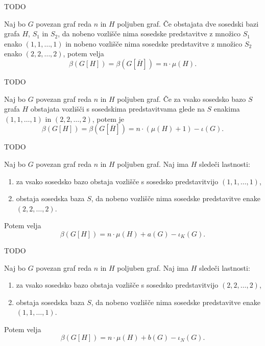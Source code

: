 \documentclass[mat1, tisk]{fmfdelo}
\newcommand{\1}{(1, 1, \ldots, 1)}
\newcommand{\2}{(2, 2, \ldots, 2)}
\begin{document}
\begin{dokaz}
    TODO
\end{dokaz}


\begin{trditev}
    Naj bo $G$ povezan graf reda $n$ in $H$ poljuben graf. Če obstajata dve sosedski bazi 
    grafa $H$, $S_1$ in $S_2$, da nobeno vozlišče nima sosedske predstavitve z množico $S_1$ 
    enako $\1$ in nobeno vozlišče nima sosedske predstavitve z množico $S_2$ 
    enako $\2$, potem velja $$\beta(G[H]) = \beta(G[\overline{H}]) = n \cdot \mu(H). $$
\end{trditev}

\begin{dokaz}
    TODO
\end{dokaz}


\begin{trditev}
    Naj bo $G$ povezan graf reda $n$ in $H$ poljuben graf. Če za vsako sosedsko bazo $S$
    grafa $H$ obstajata vozlišči s sosedskima predstavitvama glede na $S$ enakima $\1$ in $\2$,
    potem je 
    $$\beta(G[H]) = \beta(G[\overline{H}]) = n \cdot (\mu(H) + 1) - \iota(G). $$
\end{trditev}

\begin{dokaz}
    TODO
\end{dokaz}


\begin{trditev}
    Naj bo $G$ povezan graf reda $n$ in $H$ poljuben graf. Naj ima $H$ sledeči lastnosti:
    \begin{enumerate}
        \item za vsako sosedsko bazo obstaja vozlišče s sosedsko predstavitvijo $\1$,
        \item obstaja sosedska baza $S$, da nobeno vozlišče nima sosedske predstavitve enake $\2.$
    \end{enumerate} 
    Potem velja $$\beta(G[H]) = n \cdot \mu(H) + a(G) - \iota_K(G). $$
\end{trditev}

\begin{dokaz}
    TODO
\end{dokaz}


\begin{trditev}
    Naj bo $G$ povezan graf reda $n$ in $H$ poljuben graf. Naj ima $H$ sledeči lastnosti:
    \begin{enumerate}
        \item za vsako sosedsko bazo obstaja vozlišče s sosedsko predstavitvijo $\2$,
        \item obstaja sosedska baza $S$, da nobeno vozlišče nima sosedske predstavitve enake $\1.$
    \end{enumerate} 
    Potem velja $$\beta(G[H]) = n \cdot \mu(H) + b(G) - \iota_N(G). $$
\end{trditev}
\end{document}
